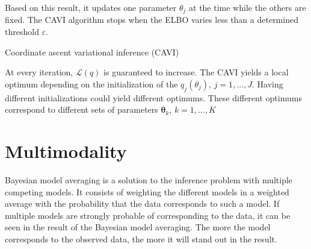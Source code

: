 \documentclass{article}
\numberwithin{equation}{section}
\begin{document}
Based on this result, it updates one parameter $\theta_j$ at the time while the others are fixed. The CAVI algorithm stops when the \small{ELBO} varies less than a determined threshold $\varepsilon$.\\
\newline
\begin{algorithm}
\BlankLine
{}
\BlankLine
{}
\BlankLine
{}
\caption{Coordinate ascent variational inference (\small{CAVI})\label{algo:CAVI}}
\end{algorithm}

At every iteration, $\mathcal{L}(q)$ is guaranteed to increase. The CAVI yields a local optimum depending on the initialization of the $q_j(\theta_j)$, $j=1,\ldots,J$. Having different initializations could yield different optimums. These different optimums correspond to different sets of parameters $\boldsymbol{\theta}_k$, $k=1,\ldots,K$

\section{Multimodality}

Bayesian model averaging is a solution to the inference problem with multiple competing models. It consists of weighting the different models in a weighted average with the probability that the data corresponds to such a model. If multiple models are strongly probable of corresponding to the data, it can be seen in the result of the Bayesian model averaging. The more the model corresponds to the observed data, the more it will stand out in the result.
\end{document}
